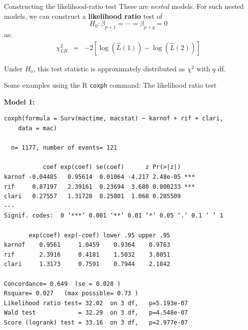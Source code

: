 \documentclass[envcountsect, 10pt, portrait, palatino]{beamer}
\begin{document}
\begin{frame}{Constructing the likelihood-ratio test}
These are {\em nested} models.  For such nested models, we can construct a {\bf likelihood ratio} test of
$$H_0: \beta_{p+1}=\cdots=\beta_{p+q}=0$$ as:
\begin{eqnarray*}
\chi^2_{LR} & = & -2 \left[\log(\hat{L}(1))- \log(\hat{L}(2))\right]
\end{eqnarray*}

Under $H_o$, this test statistic is approximately distributed as
$\chi^2$ with $q$ df.
\end{frame}
\begin{frame}[fragile]{Some examples using the R {\tt coxph} command: The likelihood ratio test}

{\bf Model 1:}
\scriptsize
\begin{verbatim}
coxph(formula = Surv(mactime, macstat) ~ karnof + rif + clari,
    data = mac)

  n= 1177, number of events= 121

           coef exp(coef) se(coef)      z Pr(>|z|)
karnof -0.04485   0.95614  0.01064 -4.217 2.48e-05 ***
rif     0.87197   2.39161  0.23694  3.680 0.000233 ***
clari   0.27557   1.31728  0.25801  1.068 0.285509
---
Signif. codes:  0 ‘***’ 0.001 ‘**’ 0.01 ‘*’ 0.05 ‘.’ 0.1 ‘ ’ 1

       exp(coef) exp(-coef) lower .95 upper .95
karnof    0.9561     1.0459    0.9364    0.9763
rif       2.3916     0.4181    1.5032    3.8051
clari     1.3173     0.7591    0.7944    2.1842

Concordance= 0.649  (se = 0.028 )
Rsquare= 0.027   (max possible= 0.73 )
Likelihood ratio test= 32.02  on 3 df,   p=5.193e-07
Wald test            = 32.29  on 3 df,   p=4.548e-07
Score (logrank) test = 33.16  on 3 df,   p=2.977e-07
\end{verbatim}
\end{frame}
\end{document}
